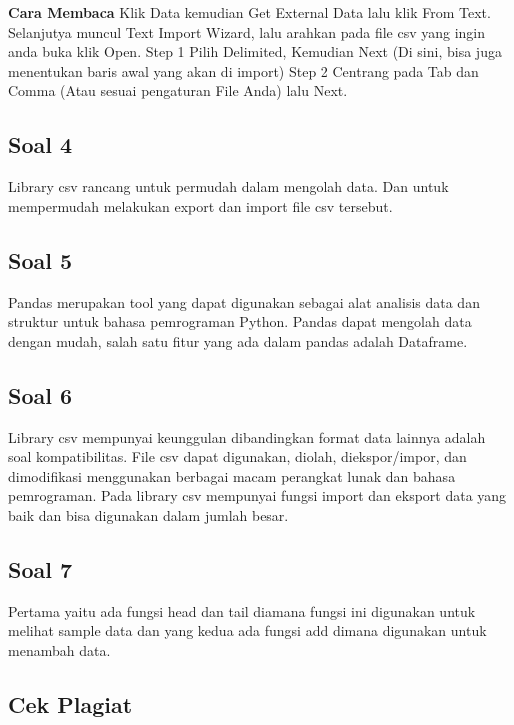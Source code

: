 \textbf{Cara Membaca}
Klik Data kemudian Get External Data lalu klik From Text. Selanjutya muncul Text Import Wizard, lalu arahkan pada file csv yang ingin anda buka klik Open. Step 1 Pilih Delimited, Kemudian Next (Di sini, bisa juga menentukan baris awal yang akan di import) Step 2 Centrang pada Tab dan Comma (Atau sesuai pengaturan File Anda) lalu Next.

\subsection{Soal 4}
Library csv rancang untuk permudah dalam mengolah data. Dan untuk mempermudah melakukan export dan import file csv tersebut.

\subsection{Soal 5}
Pandas merupakan tool yang dapat digunakan sebagai alat analisis data dan struktur untuk bahasa pemrograman Python. Pandas dapat mengolah data dengan mudah, salah satu fitur yang ada dalam pandas adalah Dataframe. 

\subsection{Soal 6}
Library csv mempunyai keunggulan dibandingkan format data lainnya adalah soal kompatibilitas. File csv dapat digunakan, diolah, diekspor/impor, dan dimodifikasi menggunakan berbagai macam perangkat lunak dan bahasa pemrograman. Pada library csv mempunyai fungsi import dan eksport data yang baik dan bisa digunakan dalam jumlah besar.

\subsection{Soal 7}
Pertama yaitu ada fungsi head dan tail diamana fungsi ini digunakan untuk melihat sample data dan yang kedua ada fungsi add dimana digunakan untuk menambah data.

\subsection{Cek Plagiat}

